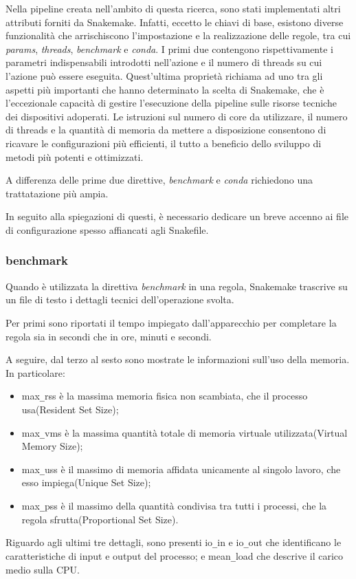 Nella pipeline creata nell'ambito di questa ricerca, sono stati implementati altri attributi forniti da Snakemake.
Infatti, eccetto le chiavi di base, esistono diverse funzionalità che arrischiscono l'impostazione e la realizzazione delle regole, tra cui \textit{params}, \textit{threads}, \textit{benchmark} e \textit{conda}.
I primi due contengono rispettivamente i parametri indispensabili introdotti nell'azione e il numero di threads su cui l'azione può essere eseguita.
Quest'ultima proprietà richiama ad uno tra gli aspetti più importanti che hanno determinato la scelta di Snakemake, che è  l'eccezionale capacità di gestire l'esecuzione della pipeline sulle risorse tecniche dei dispositivi adoperati.
Le istruzioni sul numero di core da utilizzare, il numero di threads e la quantità di memoria da mettere a disposizione consentono di ricavare le configurazioni più efficienti, il tutto a beneficio dello sviluppo di metodi più potenti e ottimizzati.

A differenza delle prime due direttive, \textit{benchmark} e \textit{conda} richiedono una trattatazione più ampia.

In seguito alla spiegazioni di questi, è necessario dedicare un breve accenno ai file di configurazione spesso affiancati agli Snakefile.

\subsubsection{benchmark}
Quando è utilizzata la direttiva \textit{benchmark} in una regola, Snakemake trascrive su un file di testo i dettagli tecnici dell'operazione svolta.

Per primi sono riportati il tempo impiegato dall'apparecchio per completare la regola sia in secondi che in ore, minuti e secondi.

A seguire, dal terzo al sesto sono mostrate le informazioni sull'uso della memoria.
In particolare:
\begin{itemize}
\item max\verb!_!rss è la massima memoria fisica non scambiata, che il processo usa(Resident Set Size);
\item max\verb!_!vms è la massima quantità totale di memoria virtuale utilizzata(Virtual Memory Size);
\item max\verb!_!uss è il massimo di memoria affidata unicamente al singolo lavoro, che esso impiega(Unique Set Size);
\item max\verb!_!pss è il massimo della quantità condivisa tra tutti i processi, che la regola sfrutta(Proportional Set Size).
\end{itemize}
Riguardo agli ultimi tre dettagli, sono presenti io\verb!_!in e io\verb!_!out che identificano le caratteristiche di input e output del processo; e mean\verb!_!load che descrive il carico medio sulla CPU.

